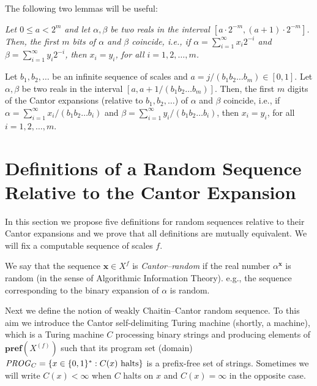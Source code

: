 \documentclass[12pt]{iopart}
\begin{document}
The following two lemmas will be useful:

{\it Let $0 \le a < 2^{m}$ and let $\alpha, \beta$ be two reals in the interval
$[a\cdot 2^{-m}, (a+1)\cdot 2^{-m}]$. Then, the first $m$ bits of $\alpha$
and $\beta$ coincide, i.e., if $\alpha = \sum_{i=1}^{\infty} x_{i}2^{-i}$
and $\beta = \sum_{i=1}^{\infty} y_{i}2^{-i}$, then $x_{i}=y_{i}$, for all
$i =1,2, \ldots ,m$.


Let $b_{1}, b_{2}, \ldots$ be an infinite sequence of scales
and $a= j/(b_{1}b_{2}\ldots b_{m})\in [0,1]. $  Let $\alpha, \beta$ be two reals in the interval
$[a, a + 1/(b_{1}b_{2}\ldots b_{m})]$. Then, the first $m$ digits of the
Cantor expansions (relative to $b_{1}, b_{2}, \ldots$) of $\alpha$ and
$\beta$ coincide, i.e., if $\alpha = \sum_{i=1}^{\infty}
x_{i}/(b_{1}b_{2}\ldots b_{i})$
and $\beta = \sum_{i=1}^{\infty} y_{i}/(b_{1}b_{2}\ldots b_{i})$, then
$x_{i}=y_{i}$, for all $i =1,2, \ldots ,m$.}

\section{Definitions of a Random Sequence Relative to the Cantor Expansion}


In this section we propose five definitions for random sequences relative to
their
Cantor expansions and we prove that all definitions are mutually equivalent.
We will fix a computable sequence of scales $f$.

We say that the sequence ${\mathbf x} \in X^{f}$ is {\it Cantor--random} if the real
number
$\alpha^{{\mathbf x}}$ is random (in the sense of Algorithmic Information Theory).
e.g., the sequence corresponding to the binary expansion of $\alpha$ is
random.


Next we define the notion of weakly Chaitin--Cantor random sequence. To this
aim we introduce the Cantor self-delimiting Turing machine (shortly, a
machine), which is a
 Turing machine $C$ processing binary strings and producing
elements of ${{\mathbf{pref}({{X^{(f)}}})}}$ such that its
program set (domain)
${\it PROG}_C=\{x\in\{0,1\}^* : C(x) \mbox{  halts}\}$
is   a prefix-free set of strings. Sometimes
we will write $C(x) < \infty$ when $C$ halts on $x$ and $C(x) = \infty$ in
the
opposite case.
\end{document}
